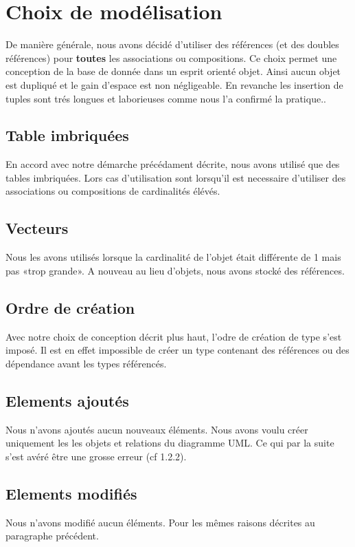 \chapter{Choix de modélisation}
De manière générale, nous avons décidé d'utiliser des références (et des doubles références) pour \textbf{toutes} les associations ou compositions. Ce choix permet une conception de la base de donnée dans un esprit orienté objet. Ainsi aucun objet est dupliqué et le gain d'espace est non négligeable. En revanche les insertion de tuples sont trés longues et laborieuses comme nous l'a confirmé la pratique..
\section{Table imbriquées}
En accord avec notre démarche précédament décrite, nous avons utilisé que des tables imbriquées. Lors cas d'utilisation sont lorsqu'il est necessaire d'utiliser des associations ou compositions de cardinalités élévés.
\section{Vecteurs}
Nous les avons utilisés lorsque la cardinalité de l'objet était différente de 1 mais pas «trop grande». A nouveau au lieu d'objets, nous avons stocké des références.
\section{Ordre de création}
Avec notre choix de conception décrit plus haut, l'odre de création de type s'est imposé. Il est en effet impossible de créer un type contenant des références ou des dépendance avant les types référencés.
\section{Elements ajoutés}
Nous n'avons ajoutés aucun nouveaux éléments. Nous avons voulu créer uniquement les les objets et relations du diagramme UML. Ce qui par la suite s'est avéré être une  grosse erreur (cf 1.2.2).
\section{Elements modifiés}
Nous n'avons modifié aucun éléments. Pour les mêmes raisons décrites au paragraphe précédent.

\clearpage
